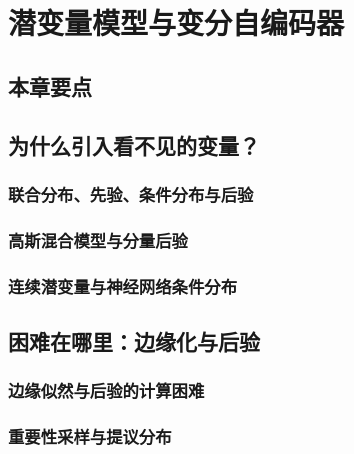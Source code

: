 \chapter{潜变量模型与变分自编码器}
\label{chap:vae}

\section*{本章要点}
\contentplaceholder

\section{为什么引入看不见的变量？}
\label{sec:vae-motivation}
\contentplaceholder

\subsection{联合分布、先验、条件分布与后验}
\label{subsec:vae-joint}
\contentplaceholder

\subsection{高斯混合模型与分量后验}
\label{subsec:vae-gmm}
\contentplaceholder

\subsection{连续潜变量与神经网络条件分布}
\label{subsec:vae-continuous}
\contentplaceholder

\section{困难在哪里：边缘化与后验}
\label{sec:vae-inference}
\contentplaceholder

\subsection{边缘似然与后验的计算困难}
\label{subsec:vae-marginalization}
\contentplaceholder

\subsection{重要性采样与提议分布}
\label{subsec:vae-importance-sampling}
\contentplaceholder

